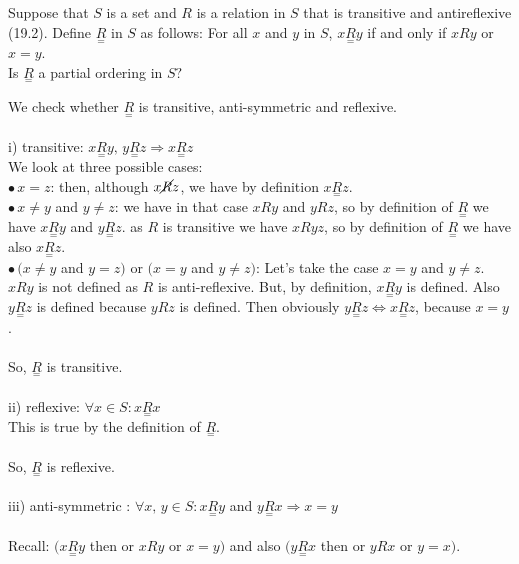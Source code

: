 \subsection{}
\begin{tcolorbox}
Suppose that $S$ is a set and $R$ is a relation in $S$ that is transitive and antireflexive (19.2). Define $\underset{=}{R}$ in $S$ as follows: For all $x$ and $y$ in $S$, $x \underset{=}{R} y$ if and only if $x R y$ or $x = y$. \\
Is $\underset{=}{R}$ a partial ordering in $S?$ 
\end{tcolorbox}
$$ $$
We check whether $\underset{=}{R}$ is transitive, anti-symmetric and reflexive.\\\\
i) transitive: $x\underset{=}{R}y,\, y\underset{=}{R}z\Rightarrow x\underset{=}{R}z$\\
We look at three possible cases:\\
$\bullet\, x=z$: then, although $ x\cancel{R}z$,  we have by definition $x\underset{=}{R}z$.\\
$\bullet\, x\neq y$ and $ y\neq z $: 
we have in that case $xRy$ and $yRz$, so by definition of $\underset{=}{R}$ we have $x\underset{=}{R}y$ and $y\underset{=}{R}z$. as $R$ is transitive we have $xRyz$, so by definition of $\underset{=}{R}$ we have also $x\underset{=}{R}z$.\\
$\bullet\, (x\neq y$ and $ y= z )$ or $( x=y$ and $ y\neq z) $: 
Let's take the case $ x=y$ and $ y\neq z $. \\
$xRy$ is not defined as $R$ is anti-reflexive. But, by definition,  $x\underset{=}{R}y$ is defined. Also $y\underset{=}{R}z$ is defined because $yRz$ is defined. Then obviously $y\underset{=}{R}z\Leftrightarrow x\underset{=}{R}z$, because $x=y$.\\\\  
So, $\underset{=}{R}$ is transitive.\\\\
ii) reflexive: $\forall x\in S: x\underset{=}{R}x$\\
This is true by the definition of $\underset{=}{R}$. \\\\
So, $\underset{=}{R}$ is reflexive.\\\\
iii) anti-symmetric : $\forall x,\,y \in S: x\underset{=}{R}y$ and $y\underset{=}{R}x\Rightarrow x=y$ \\\\
Recall: $(x\underset{=}{R}y$ then or $xRy$ or $x=y)$ and also  
$(y\underset{=}{R}x$ then or $yRx$ or $y=x)$.\\

